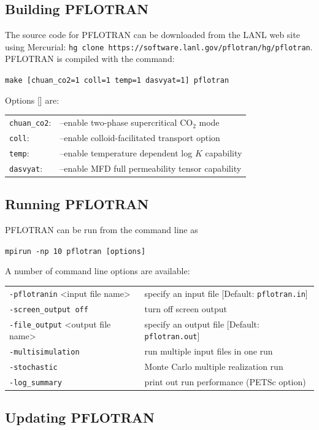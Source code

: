 \documentclass[12pt]{article}
\begin{document}
\subsection{Building PFLOTRAN}

The source code for PFLOTRAN can be downloaded from the LANL web site using Mercurial: \verb|hg clone https://software.lanl.gov/pflotran/hg/pflotran|. PFLOTRAN is compiled with the command:

\verb|make [chuan_co2=1 coll=1 temp=1 dasvyat=1] pflotran|

\noindent
Options [] are: 

\begin{tabular}{ll}
\verb|chuan_co2|: & --enable two-phase supercritical CO$_2$ mode\\
\verb|coll|: & --enable colloid-facilitated transport option\\
\verb|temp|: & --enable temperature dependent log $K$ capability\\
\verb|dasvyat|: & --enable MFD full permeability tensor capability
\end{tabular}

\subsection{Running PFLOTRAN}

PFLOTRAN can be run from the command line as

\verb|mpirun -np 10 pflotran [options]|

A number of command line options are available:

\begin{tabular}{ll}
{\tt -pflotranin} <input file name> & specify an input file [Default: {\tt pflotran.in}]\\
{\tt -screen\_output off} & turn off screen output\\
{\tt -file\_output} <output file name> & specify an output file [Default: {\tt pflotran.out}]\\
{\tt -multisimulation} & run multiple input files in one run\\
{\tt -stochastic} & Monte Carlo multiple realization run\\
{\tt -log\_summary} & print out run performance (PETSc option)
\end{tabular}

\subsection*{Updating PFLOTRAN}
\end{document}
